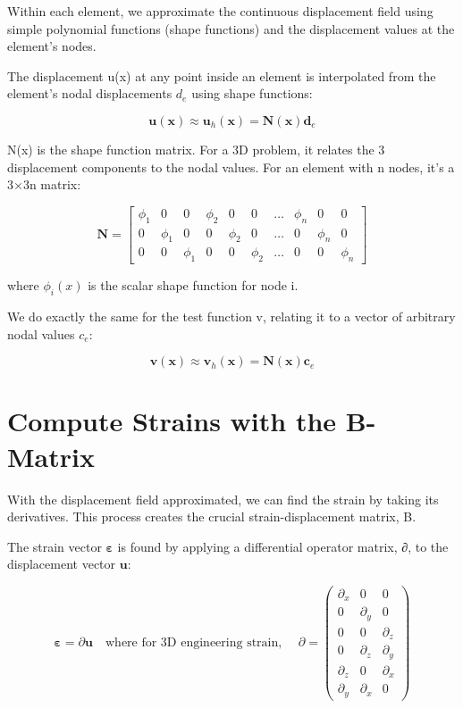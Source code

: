 \documentclass[
  11pt,
  a4paper,
]{scrbook}
\begin{document}
Within each element, we approximate the continuous displacement field
using simple polynomial functions (shape functions) and the displacement
values at the element's nodes.

The displacement u(x) at any point inside an element is interpolated
from the element's nodal displacements \(d_e\) using shape functions:

\[\mathbf{u}(\mathbf{x}) \approx \mathbf{u}_h(\mathbf{x}) = \mathbf{N}(\mathbf{x}) \mathbf{d}_e\]

N(x) is the shape function matrix. For a 3D problem, it relates the 3
displacement components to the nodal values. For an element with n
nodes, it's a 3×3n matrix:

\[\mathbf{N} = \begin{bmatrix} \phi_1 & 0 & 0 & \phi_2 & 0 & 0 & \dots & \phi_n & 0 & 0 \\ 0 & \phi_1 & 0 & 0 & \phi_2 & 0 & \dots & 0 & \phi_n & 0 \\ 0 & 0 & \phi_1 & 0 & 0 & \phi_2 & \dots & 0 & 0 & \phi_n \end{bmatrix}\]

where \(\phi_i(x)\) is the scalar shape function for node i.

We do exactly the same for the test function v, relating it to a vector
of arbitrary nodal values \(c_e\):

\[\mathbf{v}(\mathbf{x}) \approx \mathbf{v}_h(\mathbf{x}) = \mathbf{N}(\mathbf{x}) \mathbf{c}_e\]

\section{Compute Strains with the
B-Matrix}\label{compute-strains-with-the-b-matrix}

With the displacement field approximated, we can find the strain by
taking its derivatives. This process creates the crucial
strain-displacement matrix, B.

The strain vector \(\boldsymbol{\varepsilon}\) is found by applying a
differential operator matrix, ∂, to the displacement vector
\(\boldsymbol{u}\):

\[\boldsymbol{\varepsilon} = \partial \mathbf{u} \quad \text{where for 3D engineering strain, } \quad \partial = \begin{pmatrix} \partial_x & 0 & 0 \\ 0 & \partial_y & 0 \\ 0 & 0 & \partial_z \\ 0 & \partial_z & \partial_y \\ \partial_z & 0 & \partial_x \\ \partial_y & \partial_x & 0 \end{pmatrix}\]
\end{document}
